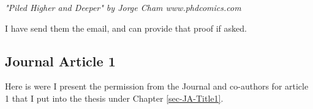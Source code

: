  \textit{	"Piled Higher and Deeper" by Jorge Cham www.phdcomics.com}
 	
I have send them the email, and can  provide that proof if asked. 

\subsection{Journal Article 1}

Here is were I present the permission from the Journal and co-authors for article 1 that I put into the thesis under Chapter \ref{sec-JA-Title1}.

